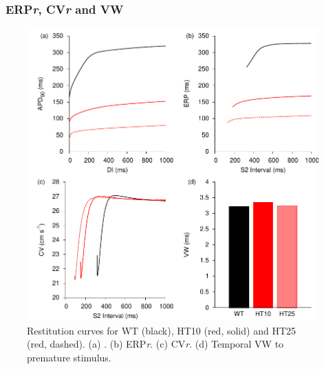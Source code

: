 \subsubsection{\apdr\, ERP\emph{r}, CV\emph{r} and VW}

\begin{figure}
\includegraphics{figures/atrium/iks/figures/03_REST}
\caption[Restitution properties with S140G mutation]{
\label{atrium:iks:apdretal}
Restitution curves for WT (black), HT10 (red, solid) and HT25 (red, dashed).
(a) \apdr.
(b) ERP\emph{r}.
(c) CV\emph{r}.
(d) Temporal VW to premature stimulus.
}
\end{figure}

